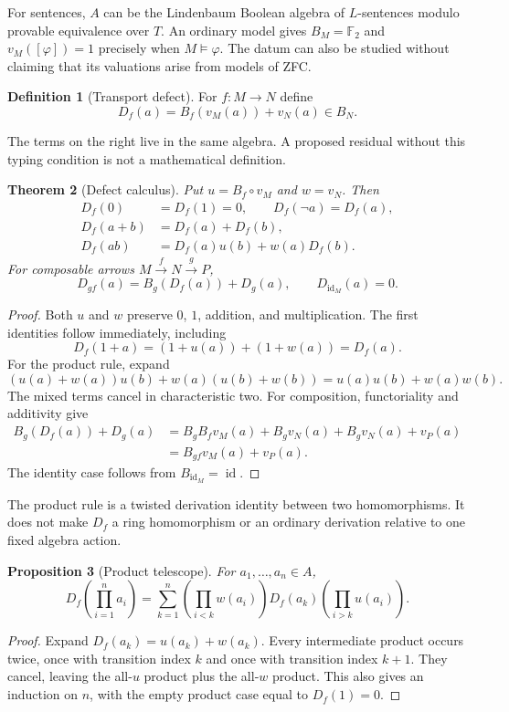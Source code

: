 \documentclass[11pt,letterpaper]{article}
\newtheorem{theorem}{Theorem}[section]
\newtheorem{proposition}[theorem]{Proposition}
\theoremstyle{definition}
\newtheorem{definition}[theorem]{Definition}
\newcommand{\F}{\mathbb F_2}
\newcommand{\id}{\operatorname{id}}
\begin{document}
For sentences, $A$ can be the Lindenbaum Boolean algebra of $L$-sentences modulo provable equivalence over $T$. An ordinary model gives $B_M=\F$ and $v_M([\varphi])=1$ precisely when $M\models\varphi$. The datum can also be studied without claiming that its valuations arise from models of ZFC.

\begin{definition}[Transport defect]
For $f:M\to N$ define
\begin{equation}\label{eq:defect}
D_f(a)=B_f(v_M(a))+v_N(a)\in B_N.
\end{equation}
\end{definition}
The terms on the right live in the same algebra. A proposed residual without this typing condition is not a mathematical definition.

\begin{theorem}[Defect calculus]\label{thm:calculus}
Put $u=B_f\circ v_M$ and $w=v_N$. Then
\begin{align}
D_f(0)&=D_f(1)=0,\qquad D_f(\neg a)=D_f(a),\\
D_f(a+b)&=D_f(a)+D_f(b),\\
D_f(ab)&=D_f(a)u(b)+w(a)D_f(b).\label{eq:leibniz}
\end{align}
For composable arrows $M\xrightarrow{f}N\xrightarrow{g}P$,
\begin{equation}\label{eq:cocycle}
D_{gf}(a)=B_g(D_f(a))+D_g(a),\qquad D_{\id_M}(a)=0.
\end{equation}
\end{theorem}
\begin{proof}
Both $u$ and $w$ preserve $0$, $1$, addition, and multiplication. The first identities follow immediately, including
\[
D_f(1+a)=(1+u(a))+(1+w(a))=D_f(a).
\]
For the product rule, expand
\[
(u(a)+w(a))u(b)+w(a)(u(b)+w(b))
=u(a)u(b)+w(a)w(b).
\]
The mixed terms cancel in characteristic two. For composition, functoriality and additivity give
\begin{align*}
B_g(D_f(a))+D_g(a)
&=B_gB_fv_M(a)+B_gv_N(a)+B_gv_N(a)+v_P(a)\\
&=B_{gf}v_M(a)+v_P(a).
\end{align*}
The identity case follows from $B_{\id_M}=\id$.
\end{proof}

The product rule is a twisted derivation identity between two homomorphisms. It does not make $D_f$ a ring homomorphism or an ordinary derivation relative to one fixed algebra action.

\begin{proposition}[Product telescope]\label{prop:producttelescope}
For $a_1,\ldots,a_n\in A$,
\[
D_f\left(\prod_{i=1}^n a_i\right)
=\sum_{k=1}^n\left(\prod_{i<k}w(a_i)\right)
D_f(a_k)\left(\prod_{i>k}u(a_i)\right).
\]
\end{proposition}
\begin{proof}
Expand $D_f(a_k)=u(a_k)+w(a_k)$. Every intermediate product occurs twice, once with transition index $k$ and once with transition index $k+1$. They cancel, leaving the all-$u$ product plus the all-$w$ product. This also gives an induction on $n$, with the empty product case equal to $D_f(1)=0$.
\end{proof}
\end{document}
